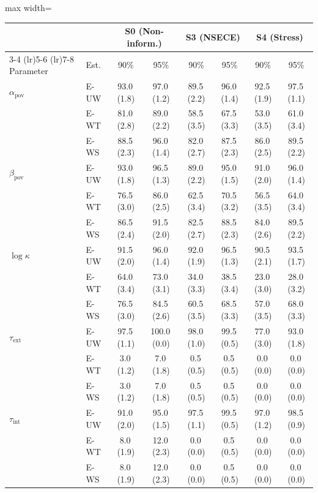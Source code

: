 \small
\begin{adjustbox}{max width=\textwidth}
\begin{tabular}{@{}l l  cc  cc  cc @{}}
\toprule
 & & \multicolumn{2}{c}{S0 (Non-inform.)} & \multicolumn{2}{c}{S3 (NSECE)} & \multicolumn{2}{c}{S4 (Stress)} \\
\cmidrule(lr){3-4} \cmidrule(lr){5-6} \cmidrule(lr){7-8}
Parameter & Est. & 90\% & 95\% & 90\% & 95\% & 90\% & 95\% \\
\midrule
$\alpha_{\text{pov}}$ & E-UW & 93.0\,(1.8) & 97.0\,(1.2) & 89.5\,(2.2) & 96.0\,(1.4) & 92.5\,(1.9) & 97.5\,(1.1) \\
 & E-WT & 81.0\,(2.8) & 89.0\,(2.2) & 58.5\,(3.5) & 67.5\,(3.3) & 53.0\,(3.5) & 61.0\,(3.4) \\
 & E-WS & 88.5\,(2.3) & 96.0\,(1.4) & 82.0\,(2.7) & 87.5\,(2.3) & 86.0\,(2.5) & 89.5\,(2.2) \\
[3pt]
$\beta_{\text{pov}}$ & E-UW & 93.0\,(1.8) & 96.5\,(1.3) & 89.0\,(2.2) & 95.0\,(1.5) & 91.0\,(2.0) & 96.0\,(1.4) \\
 & E-WT & 76.5\,(3.0) & 86.0\,(2.5) & 62.5\,(3.4) & 70.5\,(3.2) & 56.5\,(3.5) & 64.0\,(3.4) \\
 & E-WS & 86.5\,(2.4) & 91.5\,(2.0) & 82.5\,(2.7) & 88.5\,(2.3) & 84.0\,(2.6) & 89.5\,(2.2) \\
[3pt]
$\log\kappa$ & E-UW & 91.5\,(2.0) & 96.0\,(1.4) & 92.0\,(1.9) & 96.5\,(1.3) & 90.5\,(2.1) & 93.5\,(1.7) \\
 & E-WT & 64.0\,(3.4) & 73.0\,(3.1) & 34.0\,(3.3) & 38.5\,(3.4) & 23.0\,(3.0) & 28.0\,(3.2) \\
 & E-WS & 76.5\,(3.0) & 84.5\,(2.6) & 60.5\,(3.5) & 68.5\,(3.3) & 57.0\,(3.5) & 68.0\,(3.3) \\
[3pt]
$\tau_{\text{ext}}$ & E-UW & 97.5\,(1.1) & 100.0\,(0.0) & 98.0\,(1.0) & 99.5\,(0.5) & 77.0\,(3.0) & 93.0\,(1.8) \\
 & E-WT & 3.0\,(1.2) & 7.0\,(1.8) & 0.5\,(0.5) & 0.5\,(0.5) & 0.0\,(0.0) & 0.0\,(0.0) \\
 & E-WS & 3.0\,(1.2) & 7.0\,(1.8) & 0.5\,(0.5) & 0.5\,(0.5) & 0.0\,(0.0) & 0.0\,(0.0) \\
[3pt]
$\tau_{\text{int}}$ & E-UW & 91.0\,(2.0) & 95.0\,(1.5) & 97.5\,(1.1) & 99.5\,(0.5) & 97.0\,(1.2) & 98.5\,(0.9) \\
 & E-WT & 8.0\,(1.9) & 12.0\,(2.3) & 0.0\,(0.0) & 0.5\,(0.5) & 0.0\,(0.0) & 0.0\,(0.0) \\
 & E-WS & 8.0\,(1.9) & 12.0\,(2.3) & 0.0\,(0.0) & 0.5\,(0.5) & 0.0\,(0.0) & 0.0\,(0.0) \\
\bottomrule
\end{tabular}
\end{adjustbox}
